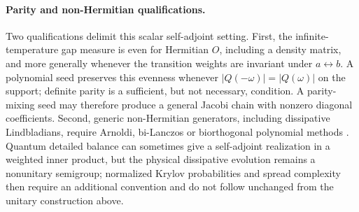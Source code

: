 \documentclass[a4paper,11pt]{article}
\theoremstyle{definition}
\theoremstyle{remark}
\begin{document}
\paragraph{Parity and non-Hermitian qualifications.}
Two qualifications delimit this scalar self-adjoint setting.  First, the
infinite-temperature gap measure is even for Hermitian $O$, including a
density matrix, and more generally whenever the transition weights are
invariant under $a\leftrightarrow b$.  A polynomial seed preserves this
evenness whenever
$|Q(-\omega)|=|Q(\omega)|$ on the support; definite parity is a
sufficient, but not necessary, condition. A parity-mixing seed may therefore produce a general Jacobi chain with nonzero diagonal
coefficients.  Second, generic non-Hermitian generators, including
dissipative Lindbladians, require Arnoldi, bi-Lanczos or biorthogonal
polynomial methods \cite{BhattacharyaNandyNathSahu2023}.  Quantum
detailed balance can sometimes give a self-adjoint realization in a
weighted inner product, but the physical dissipative evolution remains a
nonunitary semigroup; normalized Krylov probabilities and spread
complexity then require an additional convention and do not follow
unchanged from the unitary construction above.
\end{document}
